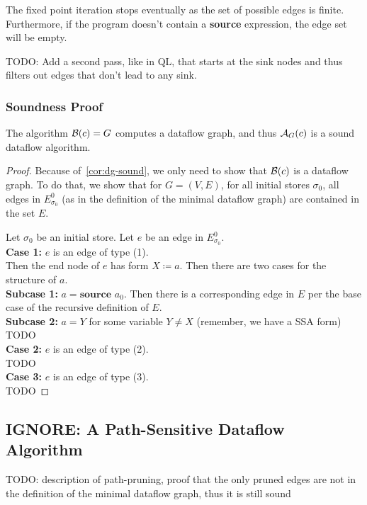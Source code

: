 The fixed point iteration stops eventually as the set of possible edges is
finite. Furthermore, if the program doesn't contain a \textbf{source} expression,
the edge set will be empty.

TODO: Add a second pass, like in QL, that starts at the sink nodes and thus
filters out edges that don't lead to any sink.

\subsubsection*{Soundness Proof}
\begin{theorem}
    The algorithm $\operatorname{\mathcal{B}}(c) = G$ computes a dataflow graph, and thus 
    $\operatorname{\mathcal{A}}_G(c)$ is a sound dataflow algorithm.
\end{theorem}
\begin{proof}
    Because of~\autoref{cor:dg-sound}, we only need to show that $\operatorname{\mathcal{B}}(c)$ is 
    a dataflow graph.
    To do that, we show that for $G=(V, E)$, for all initial stores $\sigma_0$,
    all edges in $E^0_{\sigma_0}$ (as in the definition of the minimal dataflow
    graph) are contained in the set $E$.

    Let $\sigma_0$ be an initial store.
    Let $e$ be an edge in $E^0_{\sigma_0}$.\\
    \textbf{Case 1:} $e$ is an edge of type (1).\\
    Then the end node of $e$
    has form $X \coloneqq a$.
    Then there are two cases for the structure of $a$.\\
    \textbf{Subcase 1:} $a = \textbf{source }a_0$.
    Then there is a corresponding edge in $E$ per the base case of the recursive
    definition of $E$.\\
    \textbf{Subcase 2:} $a = Y$ for some variable $Y \neq X$ (remember, we have 
    a SSA form)
    TODO\\
    \textbf{Case 2:} $e$ is an edge of type (2).\\
    TODO\\
    \textbf{Case 3:} $e$ is an edge of type (3).\\
    TODO
\end{proof}


\subsection{IGNORE: A Path-Sensitive Dataflow Algorithm}
TODO: description of path-pruning, proof that the only pruned edges are not
in the definition of the minimal dataflow graph, thus it is still sound

\fi
